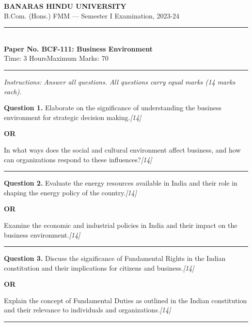\documentclass[11pt,a4paper]{article}
\newcommand{\pts}[1]{\hfill   \textit{[#1]}}
\begin{document}
\begin{center}
  {\large\bfseries BANARAS HINDU UNIVERSITY}\\[2pt]
  {\normalsize B.Com. (Hons.) FMM --- Semester I Examination, 2023-24}\\[6pt]
  \rule{0.8\linewidth}{0.5pt}\\[6pt]
  {\large\bfseries Paper No. BCF-111: Business Environment}\\[4pt]
  {\normalsize Time: 3 Hours\hfill Maximum Marks: 70}
\end{center}

\rule{\linewidth}{0.4pt}

\smallskip



\noindent   \textit{Instructions: Answer all questions. All questions carry equal marks (14 marks each).}

\bigskip




\noindent   \textbf{Question 1.}
Elaborate on the significance of understanding the business environment for strategic decision making.\pts{14}

\centerline{   \textbf{OR}}

In what ways does the social and cultural environment affect business, and how can organizations respond to these influences?\pts{14}

\medskip\rule{\linewidth}{0.2pt}




\noindent   \textbf{Question 2.}
Evaluate the energy resources available in India and their role in shaping the energy policy of the country.\pts{14}

\centerline{   \textbf{OR}}

Examine the economic and industrial policies in India and their impact on the business environment.\pts{14}

\medskip\rule{\linewidth}{0.2pt}




\noindent   \textbf{Question 3.}
Discuss the significance of Fundamental Rights in the Indian constitution and their implications for citizens and business.\pts{14}

\centerline{   \textbf{OR}}

Explain the concept of Fundamental Duties as outlined in the Indian constitution and their relevance to individuals and organizations.\pts{14}

\medskip\rule{\linewidth}{0.2pt}
\end{document}
